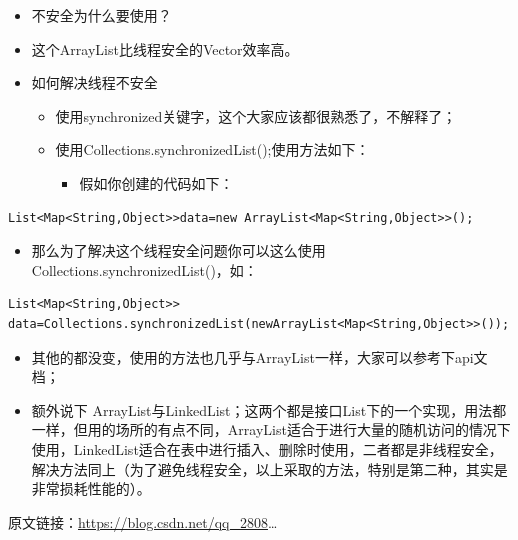 \documentclass[9pt, b5paper]{article}
\begin{document}
\begin{itemize}
\item 不安全为什么要使用？
\item 这个ArrayList比线程安全的Vector效率高。
\item 如何解决线程不安全
\begin{itemize}
\item 使用synchronized关键字，这个大家应该都很熟悉了，不解释了；
\item 使用Collections.synchronizedList();使用方法如下：
\begin{itemize}
\item 假如你创建的代码如下：
\end{itemize}
\end{itemize}
\end{itemize}
\begin{verbatim}
List<Map<String,Object>>data=new ArrayList<Map<String,Object>>();
\end{verbatim}
\begin{itemize}
\item 那么为了解决这个线程安全问题你可以这么使用Collections.synchronizedList()，如：
\end{itemize}
\begin{verbatim}
List<Map<String,Object>> data=Collections.synchronizedList(newArrayList<Map<String,Object>>());
\end{verbatim}
\begin{itemize}
\item 其他的都没变，使用的方法也几乎与ArrayList一样，大家可以参考下api文档；
\item 额外说下 ArrayList与LinkedList；这两个都是接口List下的一个实现，用法都一样，但用的场所的有点不同，ArrayList适合于进行大量的随机访问的情况下使用，LinkedList适合在表中进行插入、删除时使用，二者都是非线程安全，解决方法同上（为了避免线程安全，以上采取的方法，特别是第二种，其实是非常损耗性能的）。
\end{itemize}
原文链接：\url{https://blog.csdn.net/qq_2808}\ldots{}
\end{document}
